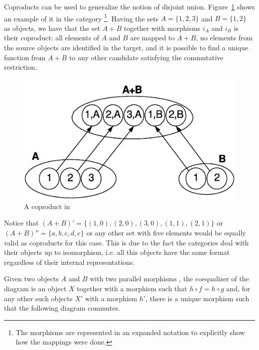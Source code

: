 \begin{example} Coproducts can be used to generalize the notion of disjoint union. Figure~\ref{fig:gts:coproduct} shows an example of it in the category \footnote{The morphisms are represented in an expanded notation to explicitly show how the mappings were done.}. Having the sets $A = \{1,2,3\}$ and $B = \{1,2\}$ as objects, we have that the set $A+B$ together with morphisms $i_A$ and $i_B$ is their coproduct: all elements of $A$ and $B$ are mapped to $A+B$, no elements from the source objects are identified in the target, and it is possible to find a unique function from $A+B$ to any other candidate satisfying the commutative restriction.

\begin{figure}[!ht]
  \centering
  \includegraphics[scale=0.4]{images/gts/coproduct-open}
  \caption{A coproduct in  }\label{fig:gts:coproduct}
\end{figure}

Notice that $(A+B)' = \{(1,0),(2,0),(3,0),(1,1),(2,1)\}$ or $(A+B)'' = \{a,b,c,d,e\}$ or any other set with five elements would be equally valid as coproducts for this case. This is due to the fact the categories deal with their objects up to isomorphism, i.e. all this objects have the same format regardless of their internal representations.
\end{example}


\begin{definition}[Coequalizer] Given two objects $A$ and $B$ with two parallel morphisms  , the coequalizer of the diagram is an object $X$ together with a morphism  such that \mbox{$h \circ f = h \circ g$} and, for any other such objects $X'$ with a morphism $h'$, there is a unique morphism  such that the following diagram commutes.

\end{definition}

